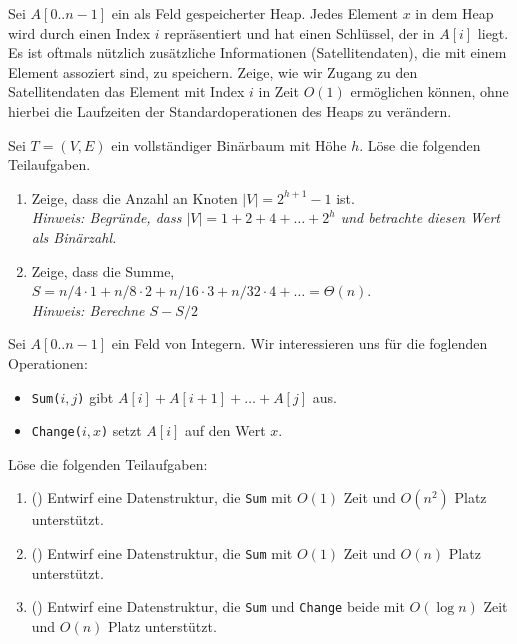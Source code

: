 \documentclass{uebung_cs}
\begin{document}
\begin{aufgabe}[Satellitendaten]
	Sei $A[0..n-1]$ ein als Feld gespeicherter Heap.
	Jedes Element $x$ in dem Heap wird durch einen Index $i$ repräsentiert und hat einen Schlüssel, der in $A[i]$ liegt.
	Es ist oftmals nützlich zusätzliche Informationen (Satellitendaten), die mit einem Element assoziert sind, zu speichern.
	Zeige, wie wir Zugang zu den Satellitendaten das Element mit Index $i$ in Zeit $O(1)$ ermöglichen können, ohne hierbei die Laufzeiten der Standardoperationen des Heaps zu verändern.
\end{aufgabe}

\begin{aufgabe}
	Sei $T = (V,E)$ ein vollständiger Binärbaum mit Höhe $h$.
	Löse die folgenden Teilaufgaben.
	\begin{enumerate}
		\item Zeige, dass die Anzahl an Knoten $|V| = 2^{h+1} - 1$ ist.\\
		\textit{Hinweis: Begründe, dass $|V| = 1 + 2 + 4 + \hdots + 2^h$ und betrachte diesen Wert als Binärzahl.}
		\item Zeige, dass die Summe, $S = n / 4 \cdot 1 + n / 8 \cdot 2 + n / 16 \cdot 3 + n / 32 \cdot 4 + \hdots = \Theta(n)$.\\
		\textit{Hinweis: Berechne $S - S/2$}
	\end{enumerate}
\end{aufgabe}


\begin{aufgabe}[Summen]
	Sei $A[0..n-1]$ ein Feld von Integern.
	Wir interessieren uns für die foglenden Operationen:
	\begin{itemize}
		\item \texttt{Sum($i,j$)} gibt $A[i] + A[i+1] + \hdots + A[j]$ aus.
		\item \texttt{Change($i,x$)} setzt $A[i]$ auf den Wert $x$.
	\end{itemize}
	Löse die folgenden Teilaufgaben:
	\begin{enumerate}
		\item (\warmup) Entwirf eine Datenstruktur, die \texttt{Sum} mit $O(1)$ Zeit und $O(n^2)$ Platz unterstützt.
		\item (\hard) Entwirf eine Datenstruktur, die \texttt{Sum} mit $O(1)$ Zeit und $O(n)$ Platz unterstützt.
		\item (\veryhard) Entwirf eine Datenstruktur, die \texttt{Sum} und \texttt{Change} beide mit $O(\log n)$ Zeit und $O(n)$ Platz unterstützt.
	\end{enumerate}
\end{aufgabe}
\end{document}
